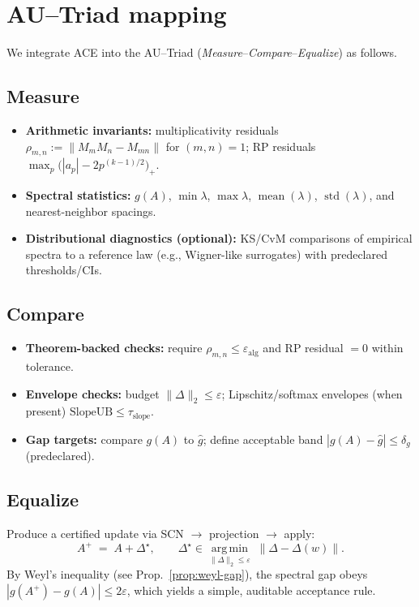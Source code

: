 \documentclass[11pt]{article}
\newcommand{\argmin}{\operatorname*{arg\,min}}
\begin{document}
\section{AU--Triad mapping}
We integrate ACE into the AU--Triad (\emph{Measure}--\emph{Compare}--\emph{Equalize}) as follows.

\subsection*{Measure}
\begin{itemize}
\item \textbf{Arithmetic invariants:} multiplicativity residuals 
$\rho_{m,n}:=\|M_mM_n-M_{mn}\|$ for $(m,n)=1$; RP residuals $\max_p\big(|a_p|-2p^{(k-1)/2}\big)_+$.
\item \textbf{Spectral statistics:} $g(A)$, $\min\lambda$, $\max\lambda$, $\operatorname{mean}(\lambda)$, $\operatorname{std}(\lambda)$, and nearest-neighbor spacings.
\item \textbf{Distributional diagnostics (optional):} KS/CvM comparisons of empirical spectra to a reference law (e.g., Wigner-like surrogates) with predeclared thresholds/CIs.
\end{itemize}

\subsection*{Compare}
\begin{itemize}
\item \textbf{Theorem-backed checks:} require $\rho_{m,n}\le \varepsilon_{\mathrm{alg}}$ and RP residual $=0$ within tolerance.
\item \textbf{Envelope checks:} budget $\|\Delta\|_2\le\varepsilon$; Lipschitz/softmax envelopes (when present) $ \mathrm{SlopeUB}\le \tau_{\mathrm{slope}}$.
\item \textbf{Gap targets:} compare $g(A)$ to $\hat g$; define acceptable band $|g(A)-\hat g|\le \delta_g$ (predeclared).
\end{itemize}

\subsection*{Equalize}
Produce a certified update via SCN $\to$ projection $\to$ apply:
\[
A^+\;=\;A+\Delta^\star,\qquad 
\Delta^\star \in \argmin_{\|\Delta\|_2\le \varepsilon}\;\big\|\Delta-\Delta(w)\big\|.
\]
By Weyl’s inequality (see Prop.~\ref{prop:weyl-gap}), the spectral gap obeys
$|g(A^+)-g(A)|\le 2\varepsilon$, which yields a simple, auditable acceptance rule.
\end{document}
